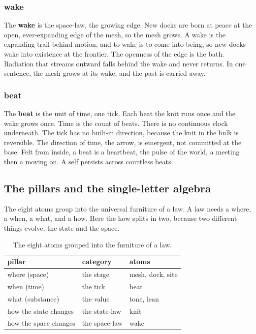 \subsubsection{wake}

The \textbf{wake} is the space-law, the growing edge. New docks are born at peace at the open, ever-expanding edge of the mesh, so the mesh grows. A wake is the expanding trail behind motion, and to wake is to come into being, so new docks wake into existence at the frontier. The openness of the edge is the bath. Radiation that streams outward falls behind the wake and never returns. In one sentence, the mesh grows at its wake, and the past is carried away.

\subsubsection{beat}

The \textbf{beat} is the unit of time, one tick. Each beat the knit runs once and the wake grows once. Time is the count of beats. There is no continuous clock underneath. The tick has no built-in direction, because the knit in the bulk is reversible. The direction of time, the arrow, is emergent, not committed at the base. Felt from inside, a beat is a heartbeat, the pulse of the world, a meeting then a moving on. A self persists across countless beats.

\subsection{The pillars and the single-letter algebra}

The eight atoms group into the universal furniture of a law. A law needs a where, a when, a what, and a how. Here the how splits in two, because two different things evolve, the state and the space.

\begin{table}[ht]
\centering
\begin{tabular}{@{}lll@{}}
\toprule
pillar & category & atoms \\
\midrule
where (space) & the stage & mesh, dock, site \\
when (time) & the tick & beat \\
what (substance) & the value & tone, lean \\
how the state changes & the state-law & knit \\
how the space changes & the space-law & wake \\
\bottomrule
\end{tabular}
\caption{The eight atoms grouped into the furniture of a law.}
\label{tab:pillars}
\end{table}

